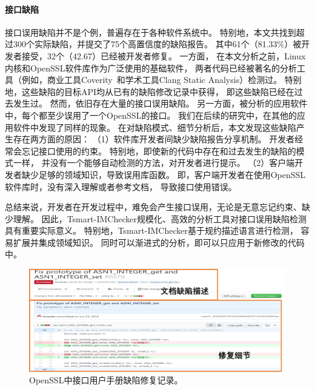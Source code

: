 \paragraph{接口缺陷}
接口误用缺陷并不是个例，普遍存在于各种软件系统中。
特别地，本文共找到超过300个实际缺陷，并提交了75个高置信度的缺陷报告。
其中61个（81.33\%）被开发者接受，32个（42.67）已经被开发者修复。
一方面，
在本文分析之前，Linux内核和OpenSSL软件库作为广泛使用的基础软件，
两者代码已经被著名的分析工具（例如，商业工具Coverity~\cite{coverity}和学术工具Clang Static Analysis）检测过。
特别地，这些缺陷的目标API均从已有的缺陷修改记录中获得，
即这些缺陷已经在过去发生过。
然而，依旧存在大量的接口误用缺陷。
另一方面，被分析的应用软件中，每个都至少误用了一个OpenSSL的接口。
我们在后续的研究中，在其他的应用软件中发现了同样的现象。
在对缺陷模式、细节分析后，本文发现这些缺陷产生存在两方面的原因：
（1）软件库开发者间缺少缺陷报告分享机制。
开发者经常会忘记接口使用的约束。
特别地，即使新的代码中存在和过去发生的缺陷的模式一样，
并没有一个能够自动检测的方法，对开发者进行提示。
（2）客户端开发者缺少足够的领域知识，导致误用库函数。
即，客户端开发者在使用OpenSSL软件库时，没有深入理解或者参考文档，
导致接口使用错误。

总结来说，开发者在开发过程中，难免会产生接口误用，无论是无意忘记约束、缺少理解。
因此，Tsmart-IMChecker规模化、高效的分析工具对接口误用缺陷检测具有重要实际意义。
特别地，Tsmart-IMChecker基于规约描述语言进行检测，
容易扩展并集成领域知识。
同时可以渐进式的分析，即可以只应用于新修改的代码中。
\begin{figure}[b]
	\centering
	\includegraphics[width=0.8\linewidth]{figures/cp4-doc-bug.png}
	\caption{
		OpenSSL中接口用户手册缺陷修复记录。
	}
	\label{fig:4-4-doc-bug}
\end{figure}
